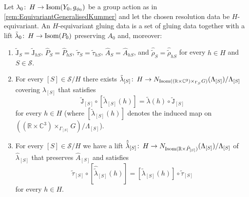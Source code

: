 \documentclass[11pt,a4paper]{scrartcl}
\newcommand{\col}{\colon \thinspace}
\numberwithin{equation}{section}
\theoremstyle{plain}
\theoremstyle{definition}
\theoremstyle{remark}
\begin{document}
\begin{remark}\label{rem:equiv_gluing_data}
Let $\lambda_0 \col H \to \textup{Isom}(Y_0,g_{\phi_0})$ be a group action as in \autoref{rem:EquivariantGeneralisedKummer} and let the chosen resolution data be $H$-equivariant. An $H$-equivariant gluing data is a set of gluing data together with a lift $\tilde{\lambda}_0 \col H \to \textup{Isom}(P_0)$ preserving $A_0$ and, moreover:
\begin{enumerate}
\item $\tilde{\mathrm{J}}_S=\tilde{\mathrm{J}}_{hS}$, $\hat{P}_S = \hat{P}_{hS}$, $\tilde{\tau}_S=\tilde{\tau}_{hS}$, $\hat{A}_{S}=\hat{A}_{hS}$, and $\hat{\tilde{\rho}}_S=\hat{\tilde{\rho}}_{hS}$ for every $h\in H$ and $S\in \mathcal{S}$.
\item For every $[S]\in \mathcal{S}/H$ there exists $\tilde{\lambda}_{[S]}\col H \to N_{\textup{Isom}((\mathbb{R}\times \mathbb{C}^3)\times_{\Gamma_S} G)}(\Lambda_{[S]})/\Lambda_{[S]}$ covering $\lambda_{[S]}$ that satisfies \[ \tilde{\mathtt{J}}_{[S]} \circ [\tilde{\lambda}_{[S]}(h)] = \tilde{\lambda}(h) \circ \tilde{\mathtt{J}}_{[S]}\] for every $h\in H$ (where $[\tilde{\lambda}_{[S]}(h)]$ denotes the induced map on $((\mathbb{R}\times \mathbb{C}^3)\times_{\Gamma_{[S]}} G)/\Lambda_{[S]}$).
\item For every $[S]\in \mathcal{S}/H$ we have a lift $\hat{\tilde{\lambda}}_{[S]} \col H \to N_{\textup{Isom}(\mathbb{R}\times\hat{P}_{[S]})}(\Lambda_{[S]})/\Lambda_{[S]}$ of $\hat{\lambda}_{[S]}$ that preserves $\hat{A}_{[S]}$ and satisfies \[ \tilde{\tau}_{[S]} \circ [\hat{\tilde{\lambda}}_{[S]}(h)] = [\tilde{\lambda}_{[S]}(h)] \circ \tilde{\tau}_{[S]}\] for every $h\in H$.
\end{enumerate}
\end{remark}
\end{document}
